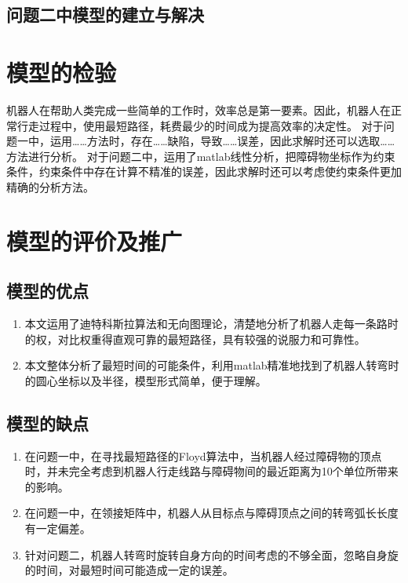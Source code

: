 \documentclass{JXUSTmodeling}
\begin{document}
\subsection{问题二中模型的建立与解决}\label{sec:5.3}

\section{模型的检验}\label{sec:6}
机器人在帮助人类完成一些简单的工作时，效率总是第一要素。因此，机器人在正常行走过程中，使用最短路径，耗费最少的时间成为提高效率的决定性。
对于问题一中，运用……方法时，存在……缺陷，导致……误差，因此求解时还可以选取……方法进行分析。
对于问题二中，运用了matlab线性分析，把障碍物坐标作为约束条件，约束条件中存在计算不精准的误差，因此求解时还可以考虑使约束条件更加精确的分析方法。


\section{模型的评价及推广}\label{sec:7}
\subsection{模型的优点}\label{sec:7.1}
\begin{enumerate}
  \item 本文运用了迪特科斯拉算法和无向图理论，清楚地分析了机器人走每一条路时的权，对比权重得直观可靠的最短路径，具有较强的说服力和可靠性。
  \item 本文整体分析了最短时间的可能条件，利用matlab精准地找到了机器人转弯时的圆心坐标以及半径，模型形式简单，便于理解。
  
\end{enumerate}
\subsection{模型的缺点}\label{sec:7.2}
\begin{enumerate}
  \item 在问题一中，在寻找最短路径的Floyd算法中，当机器人经过障碍物的顶点时，并未完全考虑到机器人行走线路与障碍物间的最近距离为10个单位所带来的影响。
  \item 在问题一中，在领接矩阵中，机器人从目标点与障碍顶点之间的转弯弧长长度有一定偏差。
  \item 针对问题二，机器人转弯时旋转自身方向的时间考虑的不够全面，忽略自身旋的时间，对最短时间可能造成一定的误差。
  
\end{enumerate}
\end{document}
